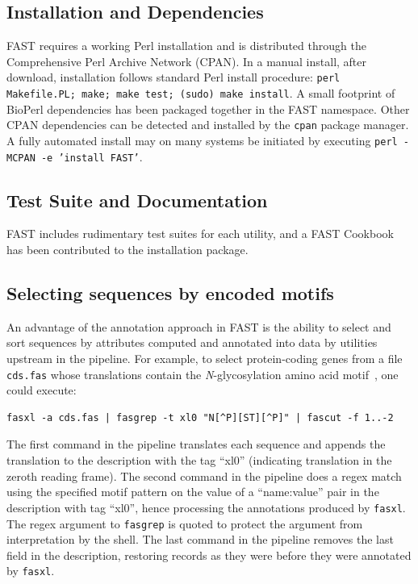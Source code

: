 \documentclass{frontiersSCNS} %
\begin{document}
\subsection{Installation and Dependencies}
FAST requires a working Perl installation and is distributed through
the Comprehensive Perl Archive Network (CPAN). In a manual install,
after download, installation follows standard Perl install procedure:
{\tt perl Makefile.PL; make; make test; (sudo) make install}. A small
footprint of BioPerl dependencies has been packaged together in the
FAST namespace. Other CPAN dependencies can be detected and installed
by the {\tt cpan} package manager. A fully automated install may on
many systems be initiated by executing {\tt perl -MCPAN -e 'install
  FAST'}.

\subsection{Test Suite and Documentation}
FAST includes rudimentary test suites for each utility, and a FAST
Cookbook has been contributed to the installation package.

\subsection{Selecting sequences by encoded motifs }

An advantage of the annotation approach in FAST is the ability to
select and sort sequences by attributes computed and annotated into
data by utilities upstream in the pipeline. For example, to select
protein-coding genes from a file {\tt cds.fas} whose translations
contain the {\it N}-glycosylation amino acid
motif~\citep{KornfieldKornfield85}, one could execute:

\begin{verbatim}
fasxl -a cds.fas | fasgrep -t xl0 "N[^P][ST][^P]" | fascut -f 1..-2
\end{verbatim}
 
The first command in the pipeline translates each sequence and appends
the translation to the description with the tag ``xl0'' (indicating
translation in the zeroth reading frame). The second command in the
pipeline does a regex match using the specified motif pattern on the
value of a ``name:value'' pair in the description with tag ``xl0'',
hence processing the annotations produced by {\tt fasxl}. The regex
argument to {\tt fasgrep} is quoted to protect the argument from
interpretation by the shell. The last command in the pipeline removes
the last field in the description, restoring records as they were
before they were annotated by {\tt fasxl}.
\end{document}
